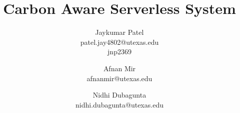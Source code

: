 \documentclass[times, 10pt,twocolumn]{article}
\begin{document}
\title{Carbon Aware Serverless System}

\author{Jaykumar Patel\\
patel.jay4802@utexas.edu\\
jnp2369\\
\and
Afnan Mir\\
afnanmir@utexas.edu\\
\and
Nidhi Dubagunta\\
nidhi.dubagunta@utexas.edu
}



\maketitle
\thispagestyle{empty}
\end{document}
